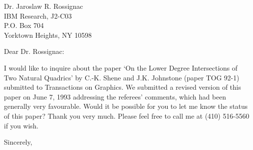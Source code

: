 \signature{Prof. John K. Johnstone\\jj@cs.jhu.edu}

\begin{letter}
{Dr. Jaroslaw R. Rossignac\\
IBM Research, J2-C03\\
P.O. Box 704\\
Yorktown Heights, NY  10598
}

\noindent \opening{Dear Dr. Rossignac:}

I would like to inquire about the
paper `On the Lower Degree Intersections of Two Natural Quadrics'
by C.-K. Shene and J.K. Johnstone (paper TOG 92-1) submitted
to Transactions on Graphics.
We submitted a revised version of this paper on June 7, 1993
addressing the referees' comments, which had been generally
very favourable.  
Would it be possible for you to let me know the status of this
paper?
Thank you very much.
Please feel free to call me at (410) 516-5560 if you wish.

\closing{Sincerely,}
\end{letter}


